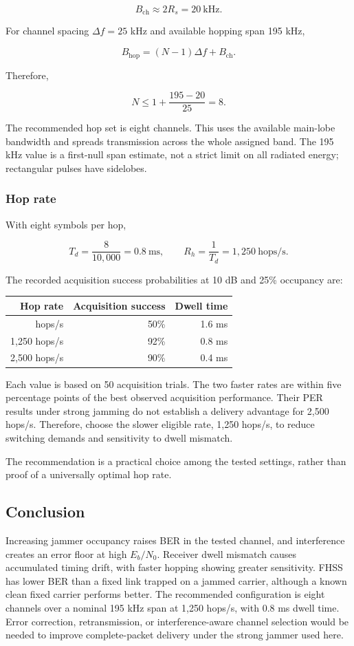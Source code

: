 \documentclass[
  11pt,
]{article}
\newcounter{none} %
\begin{document}
\[B_{\mathrm{ch}}\approx2R_s=20\ \mathrm{kHz}.\]

For channel spacing \(\Delta f=25\) kHz and available hopping span 195
kHz,

\[B_{\mathrm{hop}}=(N-1)\Delta f+B_{\mathrm{ch}}.\]

Therefore,

\[N\leq1+\frac{195-20}{25}=8.\]

The recommended hop set is eight channels. This uses the available
main-lobe bandwidth and spreads transmission across the whole assigned
band. The 195 kHz value is a first-null span estimate, not a strict
limit on all radiated energy; rectangular pulses have sidelobes.

\subsubsection{Hop rate}\label{hop-rate}

With eight symbols per hop,

\[T_d=\frac{8}{10,000}=0.8\ \mathrm{ms},\qquad R_h=\frac{1}{T_d}=1,250\ \mathrm{hops/s}.\]

The recorded acquisition success probabilities at 10 dB and 25\%
occupancy are:

{\def\LTcaptype{none} %
\begin{longtable}[]{@{}rrr@{}}
\toprule\noalign{}
Hop rate & Acquisition success & Dwell time \\
\midrule\noalign{}
\endhead
\bottomrule\noalign{}
\endlastfoot
625 hops/s & 50\% & 1.6 ms \\
1,250 hops/s & 92\% & 0.8 ms \\
2,500 hops/s & 90\% & 0.4 ms \\
\end{longtable}
}

Each value is based on 50 acquisition trials. The two faster rates are
within five percentage points of the best observed acquisition
performance. Their PER results under strong jamming do not establish a
delivery advantage for 2,500 hops/s. Therefore, choose the slower
eligible rate, 1,250 hops/s, to reduce switching demands and sensitivity
to dwell mismatch.

The recommendation is a practical choice among the tested settings,
rather than proof of a universally optimal hop rate.

\subsection{Conclusion}\label{conclusion}

Increasing jammer occupancy raises BER in the tested channel, and
interference creates an error floor at high \(E_b/N_0\). Receiver dwell
mismatch causes accumulated timing drift, with faster hopping showing
greater sensitivity. FHSS has lower BER than a fixed link trapped on a
jammed carrier, although a known clean fixed carrier performs better.
The recommended configuration is eight channels over a nominal 195 kHz
span at 1,250 hops/s, with 0.8 ms dwell time. Error correction,
retransmission, or interference-aware channel selection would be needed
to improve complete-packet delivery under the strong jammer used here.
\end{document}
